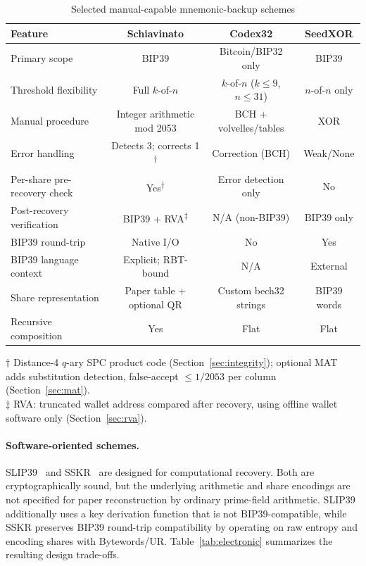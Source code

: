 \documentclass[11pt]{article}
\begin{document}
\begin{table}[H]
\centering
\caption{Selected manual-capable mnemonic-backup schemes}
\label{tab:manual}
\small
\begin{tabular}{@{}lccc@{}}
\toprule
\textbf{Feature} & \textbf{Schiavinato} & \textbf{Codex32} & \textbf{SeedXOR} \\ \midrule
Primary scope & BIP39 & Bitcoin/BIP32 only & BIP39 \\
Threshold flexibility & Full $k$-of-$n$ & $k$-of-$n$ ($k \leq 9$, $n \leq 31$) & $n$-of-$n$ only \\
Manual procedure & Integer arithmetic mod 2053 & BCH + volvelles/tables & XOR \\
Error handling & Detects 3; corrects 1\textsuperscript{$\dagger$} & Correction (BCH) & Weak/None \\
Per-share pre-recovery check & Yes\textsuperscript{$\dagger$} & Error detection only & No \\
Post-recovery verification & BIP39 + RVA\textsuperscript{$\ddagger$} & N/A (non-BIP39) & BIP39 only \\
BIP39 round-trip & Native I/O & No & Yes \\
BIP39 language context & Explicit; RBT-bound & N/A & External \\
Share representation & Paper table + optional QR & Custom bech32 strings & BIP39 words \\
Recursive composition & Yes & Flat & Flat \\
\bottomrule
\end{tabular}

\medskip
\footnotesize
$\dagger$ Distance-4 $q$-ary SPC product code (Section~\ref{sec:integrity}); optional MAT adds substitution detection, false-accept $\leq 1/2053$ per column (Section~\ref{sec:mat}).\\
$\ddagger$ RVA: truncated wallet address compared after recovery, using offline wallet software only (Section~\ref{sec:rva}).
\end{table}

\paragraph{Software-oriented schemes.} SLIP39~\cite{slip39} and SSKR~\cite{sskr} are designed for computational recovery. Both are cryptographically sound, but the underlying arithmetic and share encodings are not specified for paper reconstruction by ordinary prime-field arithmetic. SLIP39 additionally uses a key derivation function that is not BIP39-compatible, while SSKR preserves BIP39 round-trip compatibility by operating on raw entropy and encoding shares with Bytewords/UR. Table~\ref{tab:electronic} summarizes the resulting design trade-offs.
\end{document}
